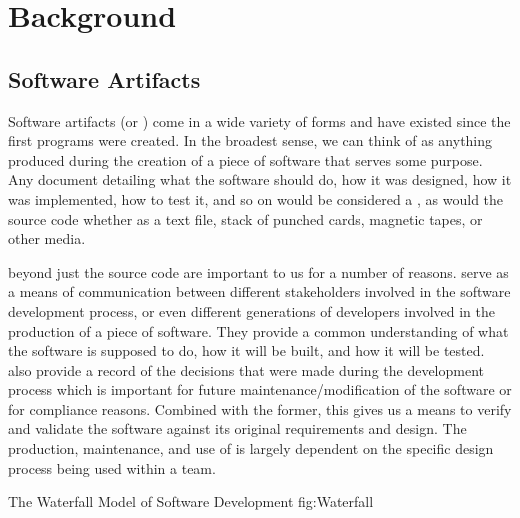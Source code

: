 \chapter{Background}
\section{Software Artifacts}
\label{sec:sfs}

Software artifacts (or \sfs{}) come in a wide variety of forms and have existed 
since the first programs were created. In the broadest sense, we can think of 
\sfs{} as anything produced during the creation of a piece of software that 
serves some purpose. Any document detailing what the software should do, how it 
was designed, how it was implemented, how to test it, and so on would be 
considered a \sf{}, as would the source code whether as a text file, stack of 
punched cards, magnetic tapes, or other media.

\SFS{} beyond just the source code are important to us for a number of reasons. 
\SFS{} serve as a means of communication between different stakeholders 
involved in the software development process, or even different generations of 
developers involved in the production of a piece of software. They provide a 
common understanding of what the software is supposed to do, how it will be 
built, and how it will be tested. \SFS{} also provide a record of the decisions 
that were made during the development process which is important for future 
maintenance/modification of the software or for compliance reasons. Combined 
with the former, this gives us a means to verify and validate the software 
against its original requirements and design. The production, maintenance, and 
use of \sfs{} is largely dependent on the specific design process being used 
within a team.

{The Waterfall Model of Software Development}
{fig:Waterfall}

